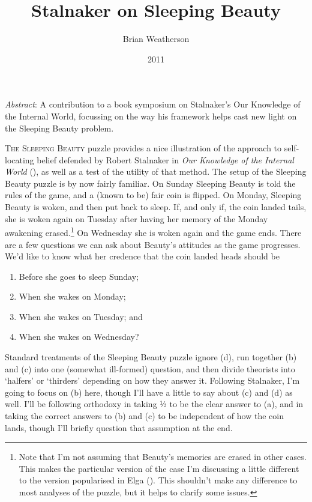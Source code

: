 \documentclass[
  11pt,
  letterpaper,
  DIV=11,
  numbers=noendperiod,
  twoside]{scrartcl}
\title{Stalnaker on Sleeping Beauty}
\author{Brian Weatherson}
\date{2011}
\providecommand{\tightlist}{%
  \setlength{\itemsep}{0pt}\setlength{\parskip}{0pt}}
\renewenvironment{abstract}
 {\vspace{-1.25cm}
 \quotation\small\noindent\emph{Abstract}:}
 {\endquotation}
\renewenvironment{abstract}
 {\quotation\small\noindent\emph{Abstract}:}
 {\endquotation\vspace{-0.02cm}}
\begin{document}
\maketitle
\begin{abstract}
A contribution to a book symposium on Stalnaker's Our Knowledge of the
Internal World, focussing on the way his framework helps cast new light
on the Sleeping Beauty problem.
\end{abstract}


\lettrine{T}{he Sleeping Beauty} puzzle provides a nice illustration of
the approach to self-locating belief defended by Robert Stalnaker in
\emph{Our Knowledge of the Internal World}
(), as well as a test of the
utility of that method. The setup of the Sleeping Beauty puzzle is by
now fairly familiar. On Sunday Sleeping Beauty is told the rules of the
game, and a (known to be) fair coin is flipped. On Monday, Sleeping
Beauty is woken, and then put back to sleep. If, and only if, the coin
landed tails, she is woken again on Tuesday after having her memory of
the Monday awakening erased.\footnote{Note that I'm not assuming that
  Beauty's memories are erased in other cases. This makes the particular
  version of the case I'm discussing a little different to the version
  popularised in Elga (). This shouldn't
  make any difference to most analyses of the puzzle, but it helps to
  clarify some issues.} On Wednesday she is woken again and the game
ends. There are a few questions we can ask about Beauty's attitudes as
the game progresses. We'd like to know what her credence that the coin
landed heads should be

\begin{enumerate}
\def\labelenumi{\arabic{enumi}.}
\tightlist
\item
  Before she goes to sleep Sunday;
\item
  When she wakes on Monday;
\item
  When she wakes on Tuesday; and
\item
  When she wakes on Wednesday?
\end{enumerate}

Standard treatments of the Sleeping Beauty puzzle ignore (d), run
together (b) and (c) into one (somewhat ill-formed) question, and then
divide theorists into `halfers' or `thirders' depending on how they
answer it. Following Stalnaker, I'm going to focus on (b) here, though
I'll have a little to say about (c) and (d) as well. I'll be following
orthodoxy in taking ½ to be the clear answer to (a), and in taking the
correct answers to (b) and (c) to be independent of how the coin lands,
though I'll briefly question that assumption at the end.
\end{document}
